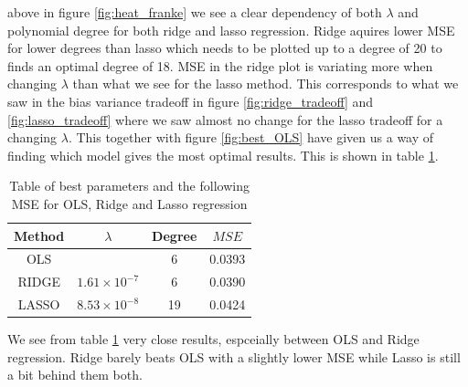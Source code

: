 \documentclass[12pt]{article}
\begin{document}
above in figure \ref{fig:heat_franke} we see a clear dependency of both $\lambda$ and polynomial degree for both ridge and lasso regression. Ridge aquires lower MSE for lower degrees than lasso which needs to be plotted up to a degree of 20 to finds an optimal degree of 18. MSE in the ridge plot is variating more when changing $\lambda$ than what we see for the lasso method. This corresponds to what we saw in the bias variance tradeoff in figure \ref{fig:ridge_tradeoff} and \ref{fig:lasso_tradeoff} where we saw almost no change for the lasso tradeoff for a changing $\lambda$. This together with figure \ref{fig:best_OLS} have given us a way of finding which model gives the most optimal results. This is shown in table \ref{tab:best_comp}.
\begin{table}[H]
  \centering
  \caption{Table of best parameters and the following MSE for OLS, Ridge and Lasso regression}
  \label{tab:best_comp}
  \begin{tabular}{|c||c|c|c|}
    \hline
    Method & $\lambda$ & Degree & $MSE$ \\
    \hline
    OLS &  & 6 & 0.0393 \\
    \hline
    RIDGE & $1.61\times10^{-7}$ & 6 & 0.0390 \\
    \hline
    LASSO & $8.53\times10^{-8}$ & 19 & 0.0424 \\
    \hline
  \end{tabular}
\end{table}
We see from table \ref{tab:best_comp} very close results, espceially between OLS and Ridge regression. Ridge barely beats OLS with a slightly lower MSE while Lasso is still a bit behind them both.
\end{document}
